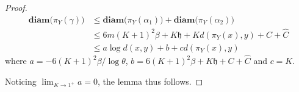 \documentclass[10pt,a4paper]{amsart}
\newcommand{\diam }[1]{{\textbf{diam}\big(#1\big)}}
\begin{document}
\begin{proof}
$$\begin{aligned}
		\diam{\pi_Y(\gamma)} &\le \diam{\pi_Y(\alpha_1)} + \diam{\pi_Y(\alpha_2)}\\
		&\le 6m (K+1)^2 \beta + K \mathfrak h + K d(\pi_Y(x), y) + C + \hat C\\
		&\le a \log d(x, y)  +b + c d(\pi_Y(x), y) 
	\end{aligned}$$
	where $a = -{6(K+1)^2 \beta}/{\log \theta}$, $b = {6(K+1)^2 \beta} + K \mathfrak h + C + \hat C$ and $c = K$. 

    
    Noticing  $\lim_{K\to 1^+} a = 0$, the lemma thus follows.
\end{proof}
\end{document}
